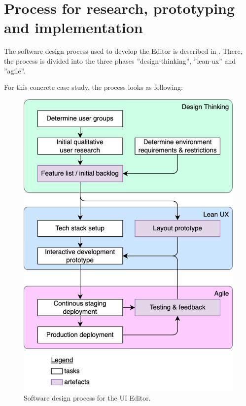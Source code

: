 \newpage
\section{Process for research, prototyping and implementation}

The software design process used to develop the Editor is described in \cite[p. 104]{LearnHCI:2020ys}.
There, the process is divided into the three phases ''\Gls{design-thinking}'', ''\Gls{lean-ux}'' and ''\Gls{agile}''.

For this concrete case study, the process looks as following:
\begin{figure}[h]
  \centering
  \includegraphics[width=0.8\linewidth]{pics/process.drawio.png}
  \caption{Software design process for the UI Editor.}
	\label{fig:process}
\end{figure}

